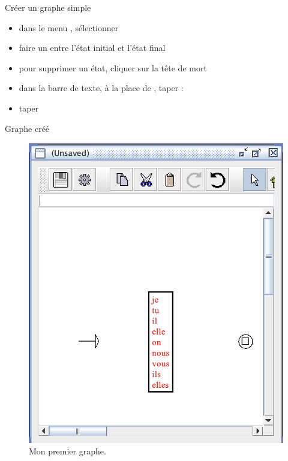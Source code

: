 \documentclass[xetex,xcolor={table,usenames,dvipsnames}]{beamer}
\begin{document}
\begin{frame}{Créer un graphe simple}
	\begin{itemize}
		\item dans le menu , sélectionner 
		\item faire un  entre l'état initial et l'état final
		\item pour supprimer un état, cliquer sur la tête de mort
		\item dans la barre de texte, à la place de , taper : 
		\item taper 
	\end{itemize}
\end{frame}

\begin{frame}{Graphe créé}
				\begin{figure}[h] %
		\centering
		\includegraphics[width=.5\linewidth]{img/graphe.png}
		\caption{Mon premier graphe.}
		\label{fig:ling_out_TAL}
	\end{figure}
\end{frame}
\end{document}
